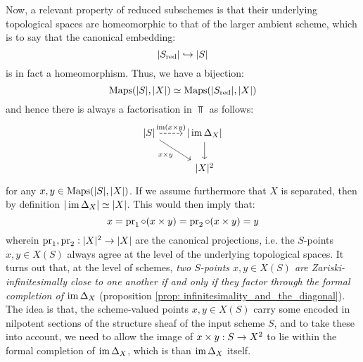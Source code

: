         Now, a relevant property of reduced subschemes is that their underlying topological spaces are homeomorphic to that of the larger ambient scheme, which is to say that the canonical embedding:
            $$|S_{\mathrm{red}}| \hookrightarrow |S|$$
        is in fact a homeomorphism. Thus, we have a bijection:
            $$\mathrm{Maps}(|S|, |X|) \simeq \mathrm{Maps}(|S_{\mathrm{red}}|, |X|)$$
        and hence there is always a factorisation in $\Top$ as follows:
            $$
                \begin{tikzcd}
                    {|S|} & {|\im \Delta_X|} \\
                    & {|X|^2}
                    \arrow["{\im(x \x y)}", dashed, from=1-1, to=1-2]
                    \arrow["{x \x y}"', from=1-1, to=2-2]
                    \arrow["{}", from=1-2, to=2-2]
                \end{tikzcd}
            $$
        for any $x, y \in \mathrm{Maps}(|S|, |X|)$. If we assume furthermore that $X$ is separated, then by definition $|\operatorname{im} \Delta_X| \simeq |X|$. This would then imply that:
            $$x = \pr_1 \circ (x \x y) = \pr_2 \circ (x \x y) = y$$
        wherein $\operatorname{pr}_1, \operatorname{pr}_2: |X|^2 \to |X|$ are the canonical projections, i.e. the $S$-points $x, y \in X(S)$ always agree at the level of the underlying topological spaces. It turns out that, at the level of schemes, \textit{two $S$-points $x, y \in X(S)$ are Zariski-infinitesimally close to one another if and only if they factor through the formal completion of $\operatorname{im} \Delta_X$} (proposition \ref{prop: infinitesimality_and_the_diagonal}). The idea is that, the scheme-valued points $x, y \in X(S)$ carry some  encoded in nilpotent sections of the structure sheaf of the input scheme $S$, and to take these  into account, we need to allow the image of $x \x y: S \to X^2$ to lie within the formal completion of $\operatorname{im} \Delta_X$, which is  than $\operatorname{im} \Delta_X$ itself.

